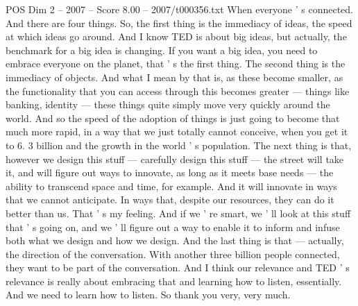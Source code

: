 \begin{textsample}{POS Dim 2 – 2007 – Score 8.00 – 2007/t000356.txt}
When everyone ' s connected.
And there are four things.
So, the first thing is the immediacy of ideas, the speed at which ideas go around.
And I know TED is about big ideas, but actually, the benchmark for a big idea is changing.
If you want a big idea, you need to embrace everyone on the planet, that ' s the first thing.
The second thing is the immediacy of objects.
And what I mean by that is, as these become smaller, as the functionality that you can access through this becomes greater — things like banking, identity — these things quite simply move very quickly around the world.
And so the speed of the adoption of things is just going to become that much more rapid, in a way that we just totally cannot conceive, when you get it to 6. 3 billion and the growth in the world ' s population.
The next thing is that, however we design this stuff — carefully design this stuff — the street will take it, and will figure out ways to innovate, as long as it meets base needs — the ability to transcend space and time, for example.
And it will innovate in ways that we cannot anticipate.
In ways that, despite our resources, they can do it better than us.
That ' s my feeling.
And if we ' re smart, we ' ll look at this stuff that ' s going on, and we ' ll figure out a way to enable it to inform and infuse both what we design and how we design.
And the last thing is that — actually, the direction of the conversation.
With another three billion people connected, they want to be part of the conversation.
And I think our relevance and TED ' s relevance is really about embracing that and learning how to listen, essentially.
And we need to learn how to listen.
So thank you very, very much.

\end{textsample}
